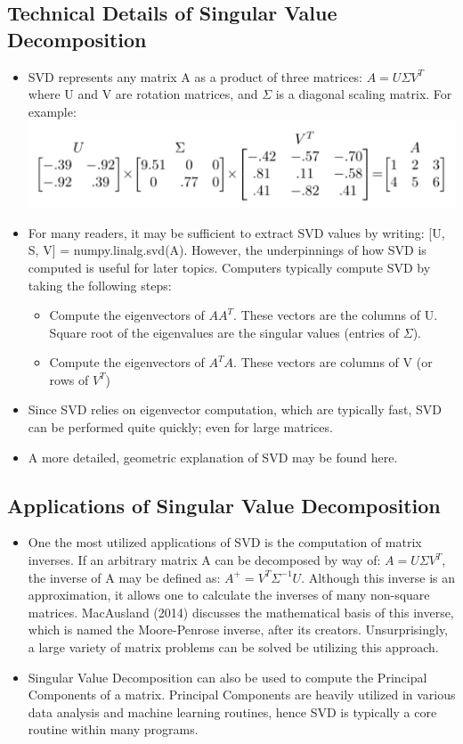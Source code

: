 \documentclass{article}
\begin{document}
\subsection{Technical Details of Singular Value Decomposition}
\begin{itemize}
\item SVD represents any matrix	A as a product of three	matrices: $A = U\Sigma V^T$ where U and V are rotation matrices, and $\Sigma$ is a diagonal scaling matrix.	For example:\\
\includegraphics[scale = 0.5]{usigv_example}
\item For many readers, it may be sufficient to extract SVD values by writing: [U, S, V] = numpy.linalg.svd(A). However, the underpinnings of how SVD is computed is useful for later topics. Computers typically compute SVD by taking the following steps:
	\begin{itemize}
    	\item Compute the eigenvectors of $AA^{T}$. These vectors are the columns of U. Square root of the eigenvalues are the singular values (entries of $\Sigma$).
        \item Compute the eigenvectors of $A^{T}A$. These vectors are columns of V (or rows of $V^{T}$)
    \end{itemize}
\item Since SVD relies on eigenvector computation, which are typically fast, SVD can be performed quite quickly; even for large matrices.
\item A more detailed, geometric explanation of SVD may be found here\cite{ams}.
\end{itemize}

\subsection{Applications of Singular Value Decomposition}
\begin{itemize}
\item One the most utilized applications of SVD is the computation of matrix inverses. If an arbitrary matrix A can be decomposed by way of: $A = U\Sigma V^T$, the inverse of A may be defined as: $A^{+} = V^T \Sigma^{-1}U$. Although this inverse is an approximation, it allows one to calculate the inverses of many non-square matrices. MacAusland (2014) discusses the mathematical basis of this inverse, which is named the Moore-Penrose inverse, after its creators\cite{moore-penrose}. Unsurprisingly, a large variety of matrix problems can be solved be utilizing this approach. 
\item Singular Value Decomposition can also be used to compute the Principal Components of a matrix. Principal Components are heavily utilized in various data analysis and machine learning routines, hence SVD is typically a core routine within many programs.
\end{itemize}
\end{document}
